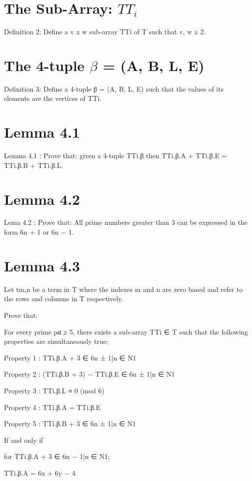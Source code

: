 \chapter{The Sub-Array: $TT_i$}

Definition 2: Define a v x w sub-array TTi of T such that v, w ≥ 2.

\chapter{The 4-tuple $\beta$ = (A, B, L, E)}

Definition 3: Define a 4-tuple β = (A, B, L, E) such that the values of its elements are the vertices of TTi.

\chapter{Lemma 4.1}

Lemma 4.1 : Prove that: given a 4-tuple TTi.β then TTi.β.A + TTi.β.E = TTi.β.B + TTi.β.L.


\chapter{Lemma 4.2}

Lema 4.2 : Prove that: All prime numbers greater than 3 can be expressed in the form 6n + 1 or 6n − 1.

\chapter{Lemma 4.3}

Let tm,n be a term in T where the indexes m and n are zero based and refer to the rows and columns in T respectively.

Prove that: 

For every prime pα ≥ 5, there exists a sub-array TTi ∈ T such that the following properties are simultaneously true;

Property 1 : TTi.β.A + 3 ∈ {6n ± 1|n ∈ N1}

Property 2 : (TTi.β.B + 3) − TTi.β.E ∈ {6n ± 1|n ∈ N1}

Property 3 : TTi.β.L ≡ 0 (mod 6)

Property 4 : TTi.β.A = TTi.β.E

Property 5 : TTi.β.B + 3 ∈ {6n ± 1|n ∈ N1}

If and only if

for TTi.β.A + 3 ∈ {6n − 1|n ∈ N1};

TTi.β.A = 6x + 6y − 4 

